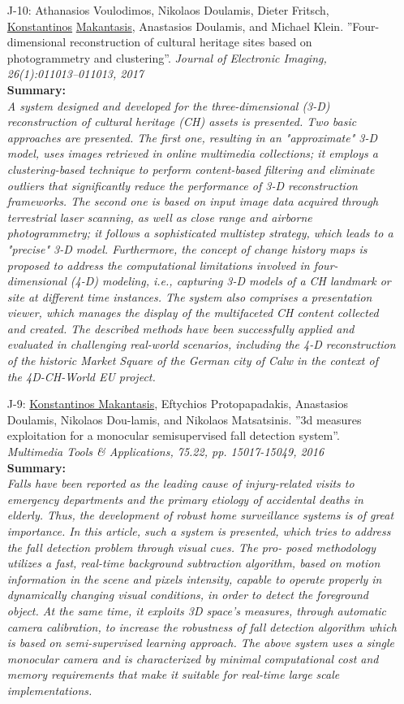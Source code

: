 \documentclass[a4paper,10pt]{article}
\begin{document}
\begin{itemize}
	\item [J-10:]Athanasios Voulodimos, Nikolaos Doulamis, Dieter Fritsch, \underline{Konstantinos} \underline{Makantasis}, Anastasios Doulamis, and Michael Klein. ''Four-dimensional reconstruction of cultural heritage sites based on photogrammetry and clustering''. \textit{Journal of Electronic Imaging, 26(1):011013–011013, 2017}\\
	\textbf{Summary:}\\
	\textit{A system designed and developed for the three-dimensional (3-D) reconstruction of cultural heritage (CH) assets is presented. Two basic approaches are presented. The first one, resulting in an "approximate" 3-D model, uses images retrieved in online multimedia collections; it employs a clustering-based technique to perform content-based filtering and eliminate outliers that significantly reduce the performance of 3-D reconstruction frameworks. The second one is based on input image data acquired through terrestrial laser scanning, as well as close range and airborne photogrammetry; it follows a sophisticated multistep strategy, which leads to a "precise" 3-D model. Furthermore, the concept of change history maps is proposed to address the computational limitations involved in four-dimensional (4-D) modeling, i.e., capturing 3-D models of a CH landmark or site at different time instances. The system also comprises a presentation viewer, which manages the display of the multifaceted CH content collected and created. The described methods have been successfully applied and evaluated in challenging real-world scenarios, including the 4-D reconstruction of the historic Market Square of the German city of Calw in the context of the 4D-CH-World EU project.}
	
	\item [J-9:]\underline{Konstantinos Makantasis}, Eftychios Protopapadakis, Anastasios Doulamis, Nikolaos Dou-lamis, and Nikolaos Matsatsinis. ''3d measures exploitation for a monocular semisupervised fall detection system''. \textit{Multimedia Tools \& Applications, 75.22, pp. 15017-15049, 2016}\\
	\textbf{Summary:}\\
	\textit{Falls have been reported as the leading cause of injury-related visits to emergency departments and the primary etiology of accidental deaths in elderly. Thus, the development of robust home surveillance systems is of great importance. In this article, such a system is presented, which tries to address the fall detection problem through visual cues. The pro- posed methodology utilizes a fast, real-time background subtraction algorithm, based on motion information in the scene and pixels intensity, capable to operate properly in dynamically changing visual conditions, in order to detect the foreground object. At the same time, it exploits 3D space’s measures, through automatic camera calibration, to increase the robustness of fall detection algorithm which is based on semi-supervised learning approach. The above system uses a single monocular camera and is characterized by minimal computational cost and memory requirements that make it suitable for real-time large scale implementations.}
	

\end{itemize}
\end{document}
